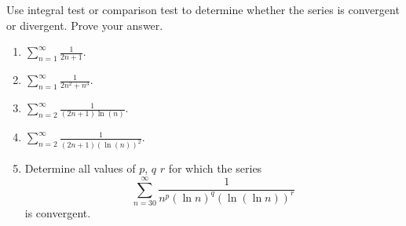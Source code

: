Use integral test or comparison test to determine whether the series is convergent or divergent. Prove your answer.
\begin{enumerate}
\item 
$\sum\limits_{n=1}^{\infty} \frac{1}{2n+1}$.
\item 
$\sum\limits_{n=1}^{\infty} \frac{1}{2n^2+n^3}$.
\item 
$\sum\limits_{n=2}^{\infty} \frac{1}{(2n+1)\ln (n)}$.
\item 
$\sum\limits_{n=2}^{\infty} \frac{1}{(2n+1)(\ln (n))^2}$.
\item 
Determine all values of $p$, $q$ $r$ for which the series 
\[
\sum_{n=30}^{\infty} \frac{1}{n^p(\ln n)^q(\ln (\ln n))^r}
\]
is convergent.
\end{enumerate}

